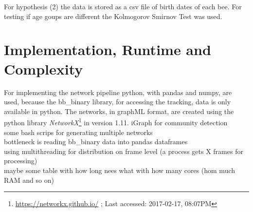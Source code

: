 For hypothesis (2) the data is stored as a csv file of birth dates of each bee. For testing if age goups are different the Kolmogorov Smirnov Test was used.

\section{Implementation, Runtime and Complexity}
For implementing the network pipeline python, with pandas and numpy, are used, because the bb\_binary library, for accessing the tracking, data is only available in python. The networks, in graphML format, are created using the python library \emph{NetworkX}\footnote{\url{https://networkx.github.io/} ; Last accessed: 2017-02-17, 08:07PM} in version 1.11.
iGraph for community detection\\
some bash scrips for generating multiple networks\\

bottleneck is reading bb\_binary data into pandas dataframes\\
using multithreading for distribution on frame level (a process gets X frames for processing)\\

maybe some table with how long nees what with how many cores (hom much RAM and so on)\\